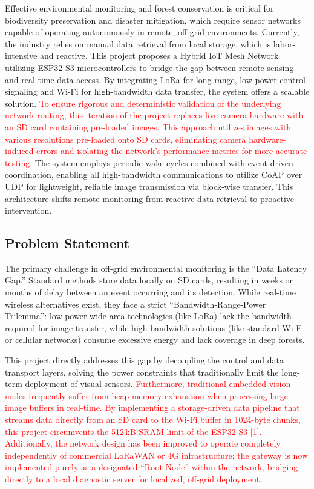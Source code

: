 \documentclass[12pt,a4paper]{article}
\DeclareRobustCommand{\changed}[1]{\textcolor{red}{#1}}
\begin{document}
Effective environmental monitoring and forest conservation is critical for biodiversity preservation and disaster mitigation, which require sensor networks capable of operating autonomously in remote, off-grid environments. Currently, the industry relies on manual data retrieval from local storage, which is labor-intensive and reactive. This project proposes a Hybrid IoT Mesh Network utilizing ESP32-S3 microcontrollers to bridge the gap between remote sensing and real-time data access. By integrating LoRa for long-range, low-power control signaling and Wi-Fi for high-bandwidth data transfer, the system offers a scalable solution. \changed{To ensure rigorous and deterministic validation of the underlying network routing, this iteration of the project replaces live camera hardware with an SD card containing pre-loaded images. This approach utilizes images with various resolutions pre-loaded onto SD cards, eliminating camera hardware-induced errors and isolating the network's performance metrics for more accurate testing.} The system employs periodic wake cycles combined with event-driven coordination, enabling all high-bandwidth communications to utilize CoAP over UDP for lightweight, reliable image transmission via block-wise transfer. This architecture shifts remote monitoring from reactive data retrieval to proactive intervention.

\subsection{Problem Statement}

The primary challenge in off-grid environmental monitoring is the ``Data Latency Gap.'' Standard methods store data locally on SD cards, resulting in weeks or months of delay between an event occurring and its detection. While real-time wireless alternatives exist, they face a strict ``Bandwidth-Range-Power Trilemma'': low-power wide-area technologies (like LoRa) lack the bandwidth required for image transfer, while high-bandwidth solutions (like standard Wi-Fi or cellular networks) consume excessive energy and lack coverage in deep forests.

This project directly addresses this gap by decoupling the control and data transport layers, solving the power constraints that traditionally limit the long-term deployment of visual sensors. \changed{Furthermore, traditional embedded vision nodes frequently suffer from heap memory exhaustion when processing large image buffers in real-time. By implementing a storage-driven data pipeline that streams data directly from an SD card to the Wi-Fi buffer in 1024-byte chunks, this project circumvents the 512\,kB SRAM limit of the ESP32-S3 [1]. Additionally, the network design has been improved to operate completely independently of commercial LoRaWAN or 4G infrastructure; the gateway is now implemented purely as a designated ``Root Node'' within the network, bridging directly to a local diagnostic server for localized, off-grid deployment.}
\end{document}
